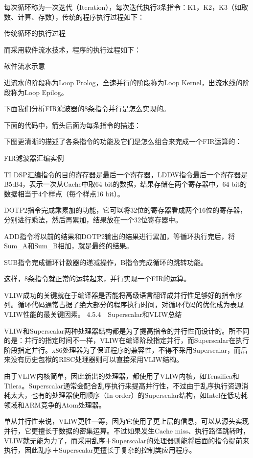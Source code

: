 \documentclass[12pt,UTF8]{ctexbook}
\begin{document}
每次循环称为一次迭代（Iteration），每次迭代执行3条指令：K1，K2，K3（如取数、计算、存数），传统的程序执行过程如下：

传统循环的执行过程

而采用软件流水技术，程序的执行过程如下：

软件流水示意

进流水的阶段称为Loop Prolog，全速并行的阶段称为Loop Kernel，出流水线的阶段称为Loop Epilog。

下面我们分析FIR滤波器的8条指令并行是怎么实现的。

下面的代码中，箭头后面为每条指令的描述：

下图更清晰的描述了各条指令的功能及它们是怎么组合来完成一个FIR运算的：

FIR滤波器汇编实例

TI DSP汇编指令的目的寄存器是最后一个寄存器，LDDW指令最后一个寄存器是B5:B4，表示一次从Cache中取64 bit的数据，结果存储在两个寄存器中，64 bit的数据相当于4个样点（每个样点16 bit）。

DOTP2指令完成乘累加的功能，它可以将32位的寄存器看成两个16位的寄存器，分别进行乘法，然后再累加，结果放在一个32位寄存器中。

ADD指令将以前的结果和DOTP2输出的结果进行累加，等循环执行完后，将Sum\_A和Sum\_B相加，就是最终的结果。

SUB指令完成循环计数器的递减操作，B指令完成循环的跳转功能。

这样，8条指令就正常的运转起来，并行实现一个FIR的运算。

VLIW成功的关键就在于编译器是否能将高级语言翻译成并行性足够好的指令序列。循环代码通常占据了绝大部分的程序执行时间，对循环代码的优化成为表现VLIW性能的最关键因素。
4.5.4　Superscalar和VLIW总结

VLIW和Superscalar两种处理器结构都是为了提高指令的并行性而设计的。所不同的是：并行的指定时间不一样，VLIW在编译阶段指定并行，而Superscalar在执行阶段指定并行。x86处理器为了保证程序的兼容性，不得不采用Superscalar，而后来没有历史包袱的RISC处理器则可以直接采用VLIW结构。

由于VLIW内核简单，因此新出的处理器，都使用了VLIW内核，如Tensilica和Tilera。Superscalar通常会配合乱序执行来提高并行性，不过由于乱序执行资源消耗太大，也有的处理器使用顺序（In-order）的Superscalar结构，如Intel在低功耗领域和ARM竞争的Atom处理器。

单从并行性来说，VLIW更胜一筹，因为它使用了更上层的信息，可以从源头实现并行，它更擅长于数据的密集运算。不过如果发生Cache miss、执行路径跳转时，VLIW就无能为力了，而采用乱序＋Superscalar的处理器则能将后面的指令提前来执行，因此乱序＋Superscalar更擅长于复杂的控制类应用程序。
\end{document}
